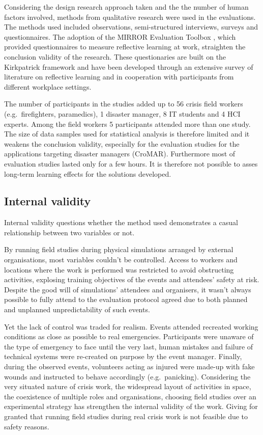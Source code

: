 Considering the design research approach taken and the the number of human factors involved, methods from qualitative research were used in the evaluations. The methods used included observations, semi-structured interviews, surveys and questionnaires. The adoption of the MIRROR Evaluation Toolbox \autocite{Renner:v4nLmwOk}, which provided questionnaires to measure reflective learning at work, straighten the conclusion validity of the research. These questionaries are built on the Kirkpatrick framework \autocite{kirkpatrick2009evaluating} and have been developed through an extensive survey of literature on reflective learning and in cooperation with participants from different workplace settings.

The number of participants in the studies added up to 56 crisis field workers (e.g.~firefighters, paramedics), 1 disaster manager, 8 IT students and 4 HCI experts. Among the field workers 5 participants attended more than one study. The size of data samples used for statistical analysis is therefore limited and it weakens the conclusion validity, especially for the evaluation studies for the applications targeting disaster managers (CroMAR). Furthermore most of evaluation studies lasted only for a few hours. It is therefore not possible to asses long-term learning effects for the solutions developed.

\subsection{Internal validity}\label{internal-validity}

Internal validity questions whether the method used demonstrates a casual relationship between two variables or not.

By running field studies during physical simulations arranged by external organisations, most variables couldn't be controlled. Access to workers and locations where the work is performed was restricted to avoid obstructing activities, explosing training objectives of the events and attendees' safety at risk. Despite the good will of simulations' attendees and organisers, it wasn't always possible to fully attend to the evaluation protocol agreed due to both planned and unplanned unpredictability of such events.

Yet the lack of control was traded for realism. Events attended recreated working conditions as close as possible to real emergencies. Participants were unaware of the type of emergency to face until the very last, human mistakes and failure of technical systems were re-created on purpose by the event manager. Finally, during the observed events, volunteers acting as injured were made-up with fake wounds and instructed to behave accordingly (e.g.~panicking). Considering the very situated nature of crisis work, the widespread layout of activities in space, the coexistence of multiple roles and organisations, choosing field studies over an experimental strategy has strengthen the internal validity of the work. Giving for granted that running field studies during real crisis work is not feasible due to safety reasons.

